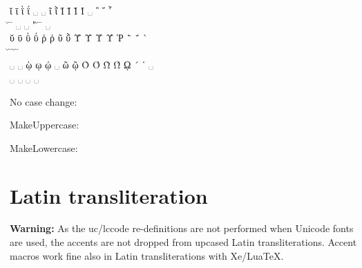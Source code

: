\documentclass[a4paper]{article}
\begin{document}
{  ῐ   ῑ   ῒ   ΐ   ␣   ␣   ῖ    ῗ    Ῐ   Ῑ   Ὶ   Ί   ␣   ῝   ῞  ῟ \\
  \u\textiota{}
  \=\textiota{}
  \accdialytikavaria\textiota{}
  \accdialytikatonos\textiota{}
  ␣ ␣ \accperispomeni\textiota{}
  \accperispomeni"\textiota{}
  \u\textIota{}
  \=\textIota{}
  \accvaria\textIota{}
  \accoxia\textIota{}
  ␣
  \accdasiavaria{}
  \accdasiaoxia{}
  \accdasiaperispomeni{} \\

  ῠ   ῡ   ῢ   ΰ   ῤ    ῥ    ῦ   ῧ   Ῠ  Ῡ  Ὺ   Ύ   Ῥ   ῭   ΅  ` \\
  \u\textupsilon{}
  \=\textupsilon{}
  \accdialytikavaria\textupsilon{}
  \accdialytikatonos\textupsilon{}
  \accpsili\textrho{}
  \accdasia\textrho{}
  \accperispomeni\textupsilon{}
  \accdialytikaperispomeni\textupsilon{}
  \u\textUpsilon{}
  \=\textUpsilon{}
  \accvaria\textUpsilon{}
  \accoxia\textUpsilon{}
  \accdasia\textRho{}
  \accdialytikavaria{}
  \accdialytikatonos{}
  \accvaria{} \\

  ␣   ␣   ῲ   ῳ   ῴ   ␣   ῶ    ῷ    Ὸ   Ό   Ὼ   Ώ   ῼ   ´   ῾  ␣ \\

  ␣ ␣ \accvaria\textomega\ypogegrammeni{}
  \textomega\ypogegrammeni{}
  \accoxia\textomega\ypogegrammeni{}
  ␣ \accperispomeni\textomega{}
  \accperispomeni\textomega\ypogegrammeni{}
  \accvaria\textOmicron{}
  \accoxia\textOmicron{}
  \accvaria\textOmega{}
  \accoxia\textOmega{}
  \textOmega\ypogegrammeni{}
  \accoxia{}
  \accdasia{} ␣
}

No case change:
\begin{quote}
  \GreekExtended
\end{quote}
%
MakeUppercase:
\begin{quote}
  \MakeUppercase{\GreekExtended}
\end{quote}
%
MakeLowercase:
\begin{quote}
  \MakeLowercase{\GreekExtended}
\end{quote}


\section{Latin transliteration}

\ifdefined \UnicodeEncodingName %
  \textbf{Warning:}
  As the uc/lccode re-definitions are not performed when Unicode fonts are
  used, the accents are not dropped from upcased Latin transliterations.
  Accent macros work fine also in Latin transliterations with Xe/LuaTeX.
\fi
\end{document}
